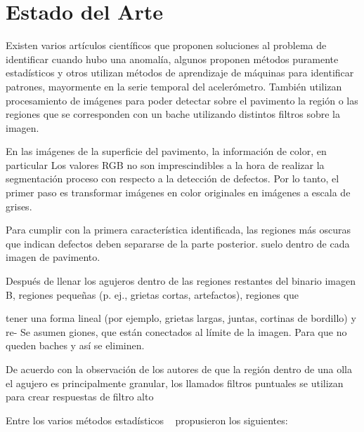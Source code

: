 \chapter{Estado del Arte}\label{chapter:state-of-the-art}

Existen varios artículos científicos que proponen soluciones al problema de identificar cuando hubo una anomalía, algunos proponen métodos
puramente estadísticos y otros utilizan métodos de aprendizaje de máquinas para identificar patrones, mayormente en la serie temporal del
acelerómetro. También utilizan procesamiento de imágenes para poder detectar sobre el pavimento la región o las regiones que se corresponden
con un bache utilizando distintos filtros sobre la imagen.


En las imágenes de la superficie del pavimento, la información de color, en particular
Los valores RGB no son imprescindibles a la hora de realizar la segmentación proceso con respecto a 
la detección de defectos. Por lo tanto, el primer paso es transformar imágenes en color originales en 
imágenes a escala de grises.

Para cumplir con la primera característica identificada, las regiones más oscuras que indican defectos deben separarse de la parte posterior.
suelo dentro de cada imagen de pavimento.

Después de llenar los agujeros dentro de las regiones restantes del binario
imagen B, regiones pequeñas (p. ej., grietas cortas, artefactos), regiones que

tener una forma lineal (por ejemplo, grietas largas, juntas, cortinas de bordillo) y re-
Se asumen giones, que están conectados al límite de la imagen.
Para que no queden baches y así se eliminen.


De acuerdo con la observación de los autores de que la región dentro de una olla
el agujero es principalmente granular, los llamados filtros puntuales se utilizan para crear
respuestas de filtro alto


Entre los varios métodos estadísticos ~\parencite{mednis2011real} propusieron los siguientes:\\

